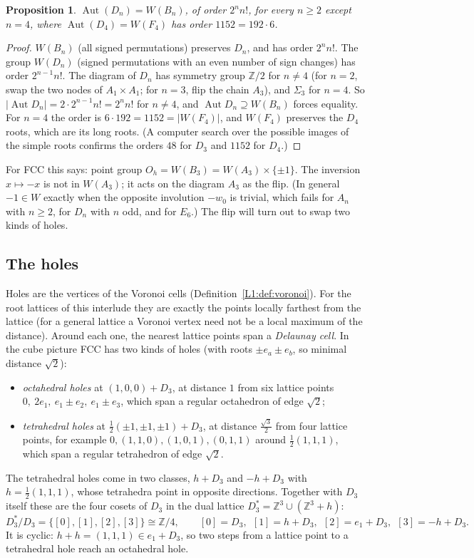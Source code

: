 \documentclass[11pt,openany]{book}
\theoremstyle{plain}
\newtheorem{proposition}[theorem]{Proposition}
\theoremstyle{definition}
\theoremstyle{remark}
\newcommand{\Z}{\mathbb{Z}}
\newcommand{\abs}[1]{\left\lvert #1 \right\rvert}
\begin{document}
\begin{proposition}\label{DYN:prop:autD}
$\operatorname{Aut}(D_n)=W(B_n)$, of order $2^nn!$, for every $n\ge2$ except $n=4$, where
$\operatorname{Aut}(D_4)=W(F_4)$ has order $1152=192\cdot6$.
\end{proposition}

\begin{proof}
$W(B_n)$ (all signed permutations) preserves $D_n$, and has order $2^nn!$. The group
$W(D_n)$ (signed permutations with an even number of sign changes) has order $2^{n-1}n!$. The diagram
of $D_n$ has symmetry group $\Z/2$ for $n\ne4$ (for $n=2$, swap the two nodes of $A_1\times A_1$; for
$n=3$, flip the chain $A_3$), and $\Sigma_3$ for $n=4$. So $\abs{\operatorname{Aut}D_n}=2\cdot2^{n-1}n!=2^nn!$
for $n\ne4$, and $\operatorname{Aut}D_n\supseteq W(B_n)$ forces equality. For $n=4$ the order is
$6\cdot192=1152=\abs{W(F_4)}$, and $W(F_4)$ preserves the $D_4$ roots, which are its long roots. (A computer
search over the possible images of the simple roots confirms the orders $48$ for $D_3$ and $1152$ for $D_4$.)
\end{proof}

For FCC this says: point group $O_h=W(B_3)=W(A_3)\times\{\pm1\}$. The inversion $x\mapsto-x$ is not in
$W(A_3)$; it acts on the diagram $A_3$ as the flip. (In general $-1\in W$ exactly when the opposite
involution $-w_0$ is trivial, which fails for $A_n$ with $n\ge2$, for $D_n$ with $n$ odd, and for
$E_6$.) The flip will turn out to swap two kinds of holes.

\subsection*{The holes}
Holes are the vertices of the Voronoi cells (Definition~\ref{L1:def:voronoi}). For the root lattices of
this interlude they are exactly the points locally farthest from the lattice (for a general lattice a
Voronoi vertex need not be a local maximum of the distance).
Around each one, the nearest lattice points span a \emph{Delaunay cell}. In the cube picture FCC has
two kinds of holes (with roots $\pm e_a\pm e_b$, so minimal distance $\sqrt2$):
\begin{itemize}
\item \emph{octahedral holes} at $(1,0,0)+D_3$, at distance $1$ from six lattice points
  $0,\ 2e_1,\ e_1\pm e_2,\ e_1\pm e_3$, which span a regular octahedron of edge $\sqrt2$;
\item \emph{tetrahedral holes} at $\frac12(\pm1,\pm1,\pm1)+D_3$, at distance $\frac{\sqrt3}2$ from four
  lattice points, for example $0,(1,1,0),(1,0,1),(0,1,1)$ around $\frac12(1,1,1)$, which span a regular
  tetrahedron of edge $\sqrt2$.
\end{itemize}
The tetrahedral holes come in two classes, $h+D_3$ and $-h+D_3$ with $h=\frac12(1,1,1)$, whose
tetrahedra point in opposite directions. Together with $D_3$ itself these are the four cosets of $D_3$ in
the dual lattice $D_3^*=\Z^3\cup(\Z^3+h)$:
\[
  D_3^*/D_3=\{[0],[1],[2],[3]\}\cong\Z/4,\qquad [0]=D_3,\ \ [1]=h+D_3,\ \ [2]=e_1+D_3,\ \ [3]=-h+D_3 .
\]
It is cyclic: $h+h=(1,1,1)\in e_1+D_3$, so two steps from a lattice point to a tetrahedral hole
reach an octahedral hole.
\end{document}
